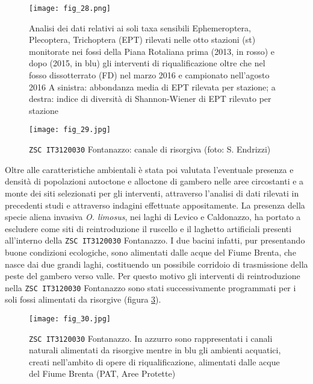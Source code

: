 \documentclass[11pt,a4paper,italian,twoside,openany]{memoir}
\begin{document}
\begin{figure}[H]
  \centering
  \texttt{[image: fig\_28.png]}
  \caption{Analisi dei dati relativi ai soli taxa sensibili Ephemeroptera, Plecoptera, Trichoptera (EPT) rilevati nelle otto stazioni (st) monitorate nei fossi della Piana Rotaliana prima (2013, in rosso) e dopo (2015, in blu) gli interventi di riqualificazione oltre che nel fosso dissotterrato (FD) nel marzo 2016 e campionato nell'agosto 2016 A sinistra: abbondanza media di EPT rilevata per stazione; a destra: indice di diversità di Shannon-Wiener di EPT rilevato per stazione}
  \label{fig_28}
\end{figure} 


\begin{figure}[H]
  \centering
  \texttt{[image: fig\_29.jpg]}
  \caption{\texttt{ZSC IT3120030} Fontanazzo: canale di risorgiva (foto: S. Endrizzi)}
  \label{fig_29}
\end{figure} 

Oltre alle caratteristiche ambientali è stata poi valutata l'eventuale presenza e densità di popolazioni autoctone e alloctone di gambero nelle aree circostanti e a monte dei siti selezionati per gli interventi, attraverso l'analisi di dati rilevati in precedenti studi e attraverso indagini effettuate appositamente. La presenza della specie aliena invasiva \emph{O. limosus}, nei laghi di Levico e Caldonazzo, ha portato a escludere come siti di reintroduzione il ruscello e il laghetto artificiali presenti all'interno della \texttt{ZSC IT3120030} Fontanazzo. I due bacini infatti, pur presentando buone condizioni ecologiche, sono alimentati dalle acque del Fiume Brenta, che nasce dai due grandi laghi, costituendo un possibile corridoio di trasmissione della peste del gambero verso valle. Per questo motivo gli interventi di reintroduzione nella \texttt{ZSC IT3120030} Fontanazzo sono stati successivamente programmati per i soli fossi alimentati da risorgive (figura \ref{fig_30}). 

\begin{figure}[!h]
  \centering
  \texttt{[image: fig\_30.jpg]}
  \caption{\texttt{ZSC IT3120030} Fontanazzo. In azzurro sono rappresentati i canali naturali alimentati da risorgive mentre in blu gli ambienti acquatici, creati nell'ambito di opere di riqualificazione, alimentati dalle acque del Fiume Brenta (PAT, Aree Protette)}
  \label{fig_30}
\end{figure} 
\end{document}
